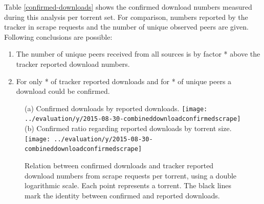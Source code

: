 \documentclass[10pt, a4paper, twoside, headsepline]{scrbook}
\renewcommand{\_}{\origunderscore\allowbreak}
\begin{document}
Table \ref{confirmed-downloads} shows the confirmed download numbers measured during this analysis per torrent set. For comparison, numbers reported by the tracker in scrape requests and the number of unique observed peers are given. Following conclusions are possible:
\begin{enumerate}
\item The number of unique peers received from all sources is by factor * above the tracker reported download numbers.
\item For only * of tracker reported downloads and for * of unique peers a download could be confirmed.
\end{enumerate}

\begin{figure}
\centering
(a) Confirmed downloads by reported downloads.
\texttt{[image: ../evaluation/y/2015-08-30\_20-combined\_download\_confirmed\_scrape]}
(b) Confirmed ratio regarding reported downloads by torrent size.
\texttt{[image: ../evaluation/y/2015-08-30\_20-combined\_download\_confirmed\_scrape]}
\caption[Download numbers: Confirmed vs. scrape request]{Relation between confirmed downloads and tracker reported download numbers from scrape requests per torrent, using a double logarithmic scale. Each point represents a torrent. The black lines mark the identity between confirmed and reported downloads.}
\label{confirmed-scrape}
\end{figure}
\end{document}
